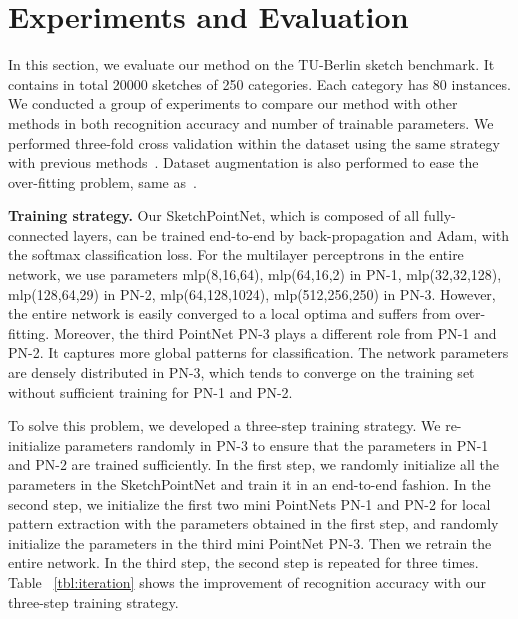\section{Experiments and Evaluation}
\label{sec:experiments}

In this section, we evaluate our method on the TU-Berlin sketch benchmark.
%
It contains in total 20000 sketches of 250 categories. Each category has 80 instances.
%
We conducted a group of experiments to compare our method with other methods in both recognition accuracy and number of trainable parameters.
%
We performed three-fold cross validation within the dataset using
the same strategy with previous methods~\cite{Yu2015SketchaNetTB, Dupont2016DeepSketch2D}.
Dataset augmentation is also performed to ease the over-fitting problem, same as~\cite{Yu2015SketchaNetTB}.


\noindent \textbf{Training strategy.}
%
Our SketchPointNet, which is composed of all fully-connected layers, can be trained end-to-end by back-propagation and Adam, with the softmax classification loss.
%
For the multilayer perceptrons in the entire network, we use parameters mlp(8,16,64), mlp(64,16,2) in PN-1, mlp(32,32,128), mlp(128,64,29) in PN-2, mlp(64,128,1024), mlp(512,256,250) in PN-3.
%
However, the entire network is easily converged to a local optima and suffers from over-fitting.
Moreover, the third PointNet PN-3 plays a different role from PN-1 and PN-2. It captures more global patterns for classification.
%
The network parameters are densely distributed in PN-3, which tends to converge on the training set without sufficient training for PN-1 and PN-2.


To solve this problem, we developed a three-step training strategy.
%
We re-initialize parameters randomly in PN-3 to ensure that the parameters in PN-1 and PN-2 are trained sufficiently.
%
In the first step, we randomly initialize all the parameters in the SketchPointNet and train it in an end-to-end fashion.
%
In the second step, we initialize the first two mini PointNets PN-1 and PN-2 for local pattern extraction with the parameters obtained in the first step, and randomly initialize the parameters in the third mini PointNet PN-3. Then we retrain the entire network.
%
In the third step, the second step is repeated for three times.
%
Table ~\ref{tbl:iteration} shows the improvement of recognition accuracy with our three-step training strategy.

